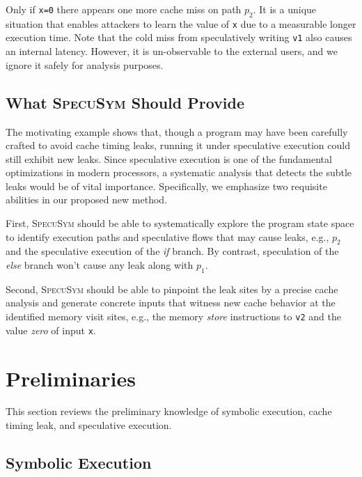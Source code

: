 \documentclass[sigconf,screen]{acmart}
\newcommand{\SpecuSym}{\textsc{SpecuSym} }
\begin{document}
Only if \texttt{x=0} there appears one more cache miss on path $p_2$. It is a 
unique situation that enables attackers to learn the value of \texttt{x} due to 
a measurable longer execution time. Note that the cold miss from speculatively 
writing \texttt{v1} also causes an internal latency. However, it is un-observable 
to the external users, and we ignore it safely for analysis purposes.


\subsection{What \SpecuSym Should Provide}
\label{sec:app-scenarios}

The motivating example shows that, though a program may have been carefully 
crafted to avoid cache timing leaks, running it under speculative execution 
could still exhibit new leaks. Since speculative execution is one of the 
fundamental optimizations in modern processors, a systematic analysis that 
detects the subtle leaks would be of vital importance. Specifically, we 
emphasize two requisite abilities in our proposed new method.


First, \SpecuSym should be able to systematically explore the program state 
space to identify execution paths and speculative flows that may cause leaks, 
e.g., $\mathit{p_2}$ and the speculative execution of the \textit{if} branch. 
By contrast, speculation of the \textit{else} branch won't cause any leak along 
with $\mathit{p_1}$.


Second, \SpecuSym should be able to pinpoint the leak sites by a precise cache 
analysis and generate concrete inputs that witness new cache behavior at the 
identified memory visit sites, e.g., the memory \textit{store} instructions to 
\texttt{v2} and the value \textit{zero} of input \texttt{x}.


\section{Preliminaries}
\label{sec:prelim}

This section reviews the preliminary knowledge of symbolic execution, cache timing leak, 
and speculative execution.


\subsection{Symbolic Execution}
\label{sec:se}
\end{document}
